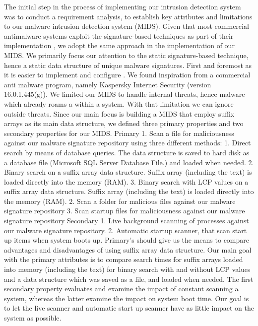 \documentclass[12pt]{article} %
\begin{document}
The initial step in the process of implementing our intrusion detection system was to conduct a requirement analysis, to establish key attributes and limitations to our malware intrusion detection system (MIDS). Given that most commercial antimalware systems exploit the signature-based techniques as part of their implementation \cite{kruegel2003using}, we adopt the same approach in the implementation of our MIDS. We primarily focus our attention to the static signature-based technique, hence a static data structure of unique malware signatures. First and foremost as it is easier to implement and configure \cite{kruegel2003using}.  
We found inspiration from a commercial anti malware program, namely Kaspersky Internet Security (version 16.0.1.445(g)). We limited our MIDS to handle internal threats, hence malware which already roams a within a system. With that limitation we can ignore outside threats. Since our main focus is building a MIDS that employ suffix arrays as its main data structure, we defined three primary  properties and two secondary properties for our MIDS. 
Primary
1.	Scan a file for maliciousness against our malware signature repository using three different methods:
1.	Direct search by means of database queries. The data structure is saved to hard disk as a database file (Microsoft SQL Server Database File.) and loaded when needed.
2.	Binary search on a suffix array data structure. Suffix array (including the text) is loaded directly into the memory (RAM). 
3.	Binary search with LCP values on a suffix array data structure. Suffix array (including the text) is loaded directly into the memory (RAM). 
2.	Scan a folder for malicious files against our malware signature repository 
3.	Scan startup files for maliciousness against our malware signature repository
Secondary
1.	Live background scanning of processes against our malware signature repository.
2.	Automatic startup scanner, that scan start up items when system boots up.  
Primary’s should give us the means to compare advantages and disadvantages of using suffix array data structure. Our main goal with the primary attributes is to compare search times for suffix arrays loaded into memory (including the text) for binary search with and without LCP values and a data structure which was saved as a file, and loaded when needed. The first secondary property evaluates and examine the impact of constant scanning a system, whereas the latter examine the impact on system boot time. Our goal is to let the live scanner and automatic start up scanner have as little impact on the system as possible. 
\end{document}
